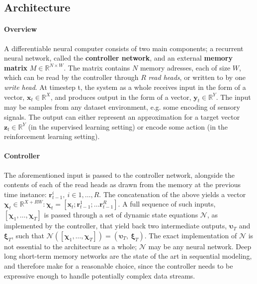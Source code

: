 \documentclass[]{article}
\begin{document}
\subsection{Architecture}
\paragraph{Overview} 
A differentiable neural computer consists of two main components; a recurrent neural network, called the \textbf{controller network}, and an external \textbf{memory matrix} $M \in \mathbb{R}^{N\times W}$. The matrix contains $N$ memory adresses, each of size $W$, which can be read by the controller through $R$ \textit{read heads}, or written to by one \textit{write head}. At timestep t, the system as a whole receives input in the form of a vector, $\pmb{x}_t \in \mathbb{R}^X$, and produces output in the form of a vector, $\pmb{y}_t \in \mathbb{R}^Y$. The input may be samples from any dataset environment, e.g. some encoding of sensory signals. The output can either represent an approximation for a target vector $\pmb{z}_t \in \mathbb{R}^Y$ (in the supervised learning setting) or encode some action (in the reinforcement learning setting).
\paragraph{Controller}
The aforementioned input is passed to the controller network, alongside the contents of each of the read heads as drawn from the memory at the previous time instance: $\pmb{r}_{t-1}^{i},\ i \in 1, \dots ,R$. The concatenation of the above yields a vector $\pmb{\chi}_t \in \mathbb{R}^{X + RW}: \pmb{\chi}_t = [\pmb{x}_t; \pmb{r}_{t-1}^1; \dots \pmb{r}_{t-1}^R ] $. A full sequence of such inputs, $[\pmb{\chi}_1,\dots ,\pmb{\chi}_T]$ is passed through a set of dynamic state equations $\mathcal{N}$, as implemented by the controller, that yield back two intermediate outputs, $\pmb{\upsilon }_T$ and $\pmb{\xi}_T$, such that $\mathcal{N}([\pmb{\chi}_1,\dots,\pmb{\chi}_T]) = (\pmb{\upsilon}_T,\ \pmb{\xi}_T)$. The exact implementation of $\mathcal{N}$ is not essential to the architecture as a whole; $\mathcal{N}$ may be any neural network. Deep long short-term memory networks are the state of the art in sequential modeling, and therefore make for a reasonable choice, since the controller needs to be expressive enough to handle potentially complex data streams.
\end{document}
